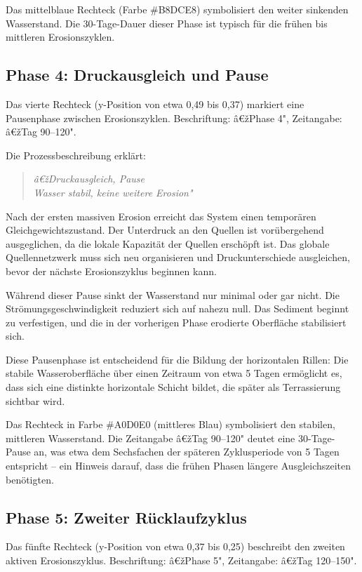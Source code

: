 ﻿\documentclass[12pt,a4paper]{report}
\begin{document}
Das mittelblaue Rechteck (Farbe \#B8DCE8) symbolisiert den weiter sinkenden Wasserstand. Die 30-Tage-Dauer dieser Phase ist typisch für die frühen bis mittleren Erosionszyklen.

\subsection{Phase 4: Druckausgleich und Pause}

Das vierte Rechteck (y-Position von etwa 0,49 bis 0,37) markiert eine Pausenphase zwischen Erosionszyklen. Beschriftung: â€žPhase 4", Zeitangabe: â€žTag 90--120".

Die Prozessbeschreibung erklärt:
\begin{quote}
	\textit{â€žDruckausgleich, Pause\\
		Wasser stabil, keine weitere Erosion"}
\end{quote}

Nach der ersten massiven Erosion erreicht das System einen temporären Gleichgewichtszustand. Der Unterdruck an den Quellen ist vorübergehend ausgeglichen, da die lokale Kapazität der Quellen erschöpft ist. Das globale Quellennetzwerk muss sich neu organisieren und Druckunterschiede ausgleichen, bevor der nächste Erosionszyklus beginnen kann.

Während dieser Pause sinkt der Wasserstand nur minimal oder gar nicht. Die Strö\-mungs\-geschwindigkeit reduziert sich auf nahezu null. Das Sediment beginnt zu verfestigen, und die in der vorherigen Phase erodierte Oberfläche stabilisiert sich.

Diese Pausenphase ist entscheidend für die Bildung der horizontalen Rillen: Die stabile Wasseroberfläche über einen Zeitraum von etwa 5 Tagen ermöglicht es, dass sich eine distinkte horizontale Schicht bildet, die später als Terrassierung sichtbar wird.

Das Rechteck in Farbe \#A0D0E0 (mittleres Blau) symbolisiert den stabilen, mittleren Wasserstand. Die Zeitangabe â€žTag 90--120" deutet eine 30-Tage-Pause an, was etwa dem Sechsfachen der späteren Zyklusperiode von 5 Tagen entspricht -- ein Hinweis darauf, dass die frühen Phasen längere Ausgleichszeiten benötigten.

\subsection{Phase 5: Zweiter Rücklaufzyklus}

Das fünfte Rechteck (y-Position von etwa 0,37 bis 0,25) beschreibt den zweiten aktiven Erosionszyklus. Beschriftung: â€žPhase 5", Zeitangabe: â€žTag 120--150".
\end{document}
